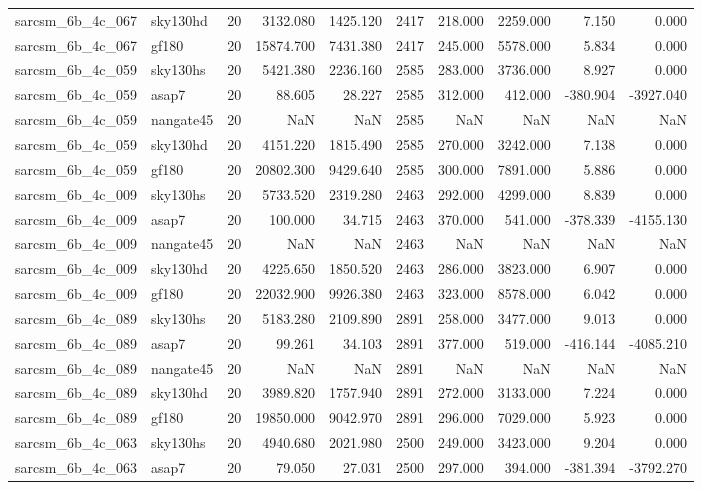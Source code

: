 \documentclass{article}
\begin{document}
\begin{longtable}{llrrrrrrrr}
sarcsm\_6b\_4c\_067 & sky130hd & 20 & 3132.080 & 1425.120 & 2417 & 218.000 & 2259.000 & 7.150 & 0.000 \\
sarcsm\_6b\_4c\_067 & gf180 & 20 & 15874.700 & 7431.380 & 2417 & 245.000 & 5578.000 & 5.834 & 0.000 \\
sarcsm\_6b\_4c\_059 & sky130hs & 20 & 5421.380 & 2236.160 & 2585 & 283.000 & 3736.000 & 8.927 & 0.000 \\
sarcsm\_6b\_4c\_059 & asap7 & 20 & 88.605 & 28.227 & 2585 & 312.000 & 412.000 & -380.904 & -3927.040 \\
sarcsm\_6b\_4c\_059 & nangate45 & 20 & NaN & NaN & 2585 & NaN & NaN & NaN & NaN \\
sarcsm\_6b\_4c\_059 & sky130hd & 20 & 4151.220 & 1815.490 & 2585 & 270.000 & 3242.000 & 7.138 & 0.000 \\
sarcsm\_6b\_4c\_059 & gf180 & 20 & 20802.300 & 9429.640 & 2585 & 300.000 & 7891.000 & 5.886 & 0.000 \\
sarcsm\_6b\_4c\_009 & sky130hs & 20 & 5733.520 & 2319.280 & 2463 & 292.000 & 4299.000 & 8.839 & 0.000 \\
sarcsm\_6b\_4c\_009 & asap7 & 20 & 100.000 & 34.715 & 2463 & 370.000 & 541.000 & -378.339 & -4155.130 \\
sarcsm\_6b\_4c\_009 & nangate45 & 20 & NaN & NaN & 2463 & NaN & NaN & NaN & NaN \\
sarcsm\_6b\_4c\_009 & sky130hd & 20 & 4225.650 & 1850.520 & 2463 & 286.000 & 3823.000 & 6.907 & 0.000 \\
sarcsm\_6b\_4c\_009 & gf180 & 20 & 22032.900 & 9926.380 & 2463 & 323.000 & 8578.000 & 6.042 & 0.000 \\
sarcsm\_6b\_4c\_089 & sky130hs & 20 & 5183.280 & 2109.890 & 2891 & 258.000 & 3477.000 & 9.013 & 0.000 \\
sarcsm\_6b\_4c\_089 & asap7 & 20 & 99.261 & 34.103 & 2891 & 377.000 & 519.000 & -416.144 & -4085.210 \\
sarcsm\_6b\_4c\_089 & nangate45 & 20 & NaN & NaN & 2891 & NaN & NaN & NaN & NaN \\
sarcsm\_6b\_4c\_089 & sky130hd & 20 & 3989.820 & 1757.940 & 2891 & 272.000 & 3133.000 & 7.224 & 0.000 \\
sarcsm\_6b\_4c\_089 & gf180 & 20 & 19850.000 & 9042.970 & 2891 & 296.000 & 7029.000 & 5.923 & 0.000 \\
sarcsm\_6b\_4c\_063 & sky130hs & 20 & 4940.680 & 2021.980 & 2500 & 249.000 & 3423.000 & 9.204 & 0.000 \\
sarcsm\_6b\_4c\_063 & asap7 & 20 & 79.050 & 27.031 & 2500 & 297.000 & 394.000 & -381.394 & -3792.270 \\

\end{longtable}
\end{document}
